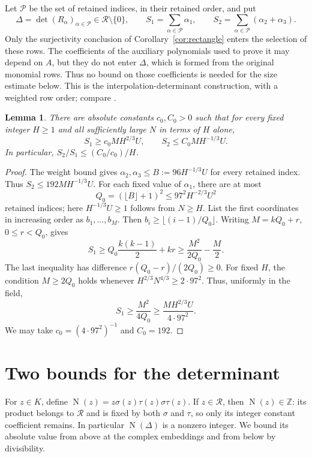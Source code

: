 \documentclass[11pt,a4paper]{amsart}
\newtheorem{lemma}[theorem]{Lemma}
\theoremstyle{remark}
\newcommand{\Z}{\mathbb Z}
\newcommand{\cR}{\mathcal R}
\newcommand{\cP}{\mathcal P}
\DeclareMathOperator{\Nm}{N}
\numberwithin{equation}{section}
\begin{document}
Let $\cP$ be the set of retained indices, in their retained order,
and put
\begin{equation}\label{eq:det}
 \Delta=\det(R_\alpha)_{\alpha\in\cP}\in\cR\setminus\{0\},
 \qquad S_1=\sum_{\alpha\in\cP}\alpha_1,
 \qquad S_2=\sum_{\alpha\in\cP}(\alpha_2+\alpha_3).
\end{equation}
Only the surjectivity conclusion of Corollary~\ref{cor:rectangle}
enters the selection of these rows. The coefficients of the auxiliary
polynomials used to prove it may depend on $A$, but they do not enter
$\Delta$, which is formed from the original monomial rows. Thus no
bound on those coefficients is needed for the size estimate below.
This is the interpolation-determinant construction, with a weighted row order; compare
\cite[Section~6]{Laurent}.

\begin{lemma}\label{lem:exponents}
There are absolute constants $c_0,C_0>0$ such that for every fixed
integer $H\ge1$ and all sufficiently large $N$ in terms of $H$ alone,
\begin{equation}\label{eq:exponents}
 S_1\ge c_0MH^{2/3}U,\qquad S_2\le C_0MH^{-1/3}U.
\end{equation}
In particular, $S_2/S_1\le(C_0/c_0)/H$.
\end{lemma}

\begin{proof}
The weight bound gives
$\alpha_2,\alpha_3\le B:=96H^{-1/3}U$ for every retained index.
Thus $S_2\le192MH^{-1/3}U$. For each fixed value of $\alpha_1$,
there are at most
\[
 Q_0=(\lfloor B\rfloor+1)^2\le97^2H^{-2/3}U^2
\]
retained indices; here $H^{-1/3}U\ge1$ follows from $N\ge H$.
List the first coordinates in increasing order as
$b_1,\ldots,b_M$. Then $b_i\ge\lfloor(i-1)/Q_0\rfloor$.
Writing $M=kQ_0+r$, $0\le r<Q_0$, gives
\[
 S_1\ge Q_0\frac{k(k-1)}2+kr
 \ge\frac{M^2}{2Q_0}-\frac M2.
\]
The last inequality has difference $r(Q_0-r)/(2Q_0)\ge0$.
For fixed $H$, the condition $M\ge2Q_0$ holds whenever
$H^{2/3}N^{4/3}\ge2\cdot97^2$. Thus, uniformly in the field,
\[
 S_1\ge\frac{M^2}{4Q_0}
 \ge\frac{MH^{2/3}U}{4\cdot97^2}.
\]
We may take $c_0=(4\cdot97^2)^{-1}$ and $C_0=192$.
\end{proof}

\section{Two bounds for the determinant}\label{sec:comparison}

For $z\in K$, define
$\Nm(z)=z\sigma(z)\tau(z)\sigma\tau(z)$.
If $z\in\cR$, then $\Nm(z)\in\Z$: its product belongs to
$\cR$ and is fixed by both $\sigma$ and $\tau$, so only its
integer constant coefficient remains. In particular
$\Nm(\Delta)$ is a nonzero integer. We bound its absolute value
from above at the complex embeddings and from below by divisibility.
\end{document}

